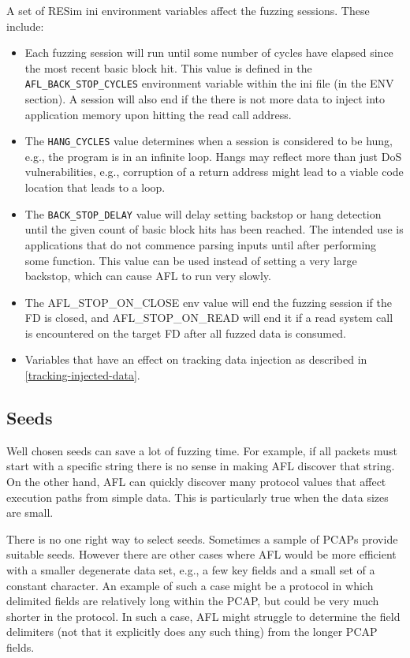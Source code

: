 \documentclass[titlepage]{article}
\begin{document}
A set of RESim ini environment variables affect the fuzzing sessions.  These include:
\begin{itemize}
\item Each fuzzing session will run until some number of cycles have elapsed since the most recent basic block hit.  This
value is defined in the {\tt AFL\_BACK\_STOP\_CYCLES} environment variable within the ini file (in the ENV section).  A session will also end
if the there is not more data to inject into application memory upon hitting the read call address.

\item The {\tt HANG\_CYCLES} value determines when a session is considered to be hung, e.g., the program is in an infinite loop.
Hangs may reflect more than just DoS vulnerabilities, e.g., corruption of a return address might lead to a viable code location
that leads to a loop.

\item The {\tt BACK\_STOP\_DELAY} value will delay setting backstop or hang detection until the given count of basic block hits has been reached.
The intended use is applications that do not commence parsing inputs until after performing some function.  This value can be used instead of setting a very
large backstop, which can cause AFL to run very slowly.

\item The AFL\_STOP\_ON\_CLOSE env value will end the fuzzing session if the FD is closed, and AFL\_STOP\_ON\_READ will end it if
a read system call is encountered on the target FD after all fuzzed data is consumed.

\item Variables that have an effect on tracking data injection as described in \ref{tracking-injected-data}.
\end{itemize}

\subsection{Seeds}
Well chosen seeds can save a lot of fuzzing time.  For example, if all packets must start with a specific string there is no sense in
making AFL discover that string.  On the other hand, AFL can quickly discover many protocol values that affect execution paths from simple
data.  This is particularly true when the data sizes are small.  

There is no one right way to select seeds.  Sometimes a sample of PCAPs provide suitable seeds.  However there are other cases where AFL would
be more efficient with a smaller degenerate data set, e.g., a few key fields and a small set of a constant character.  An example of such a case
might be a protocol in which delimited fields are relatively long within the PCAP, but could be very much shorter in the protocol.  In such a case,
AFL might struggle to determine the field delimiters (not that it explicitly does any such thing) from the longer PCAP fields.
\end{document}
